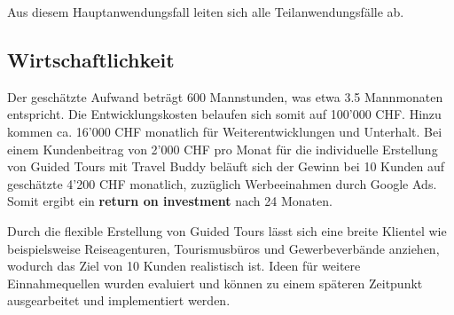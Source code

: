 Aus diesem Hauptanwendungsfall leiten sich alle Teilanwendungsfälle ab.

\subsection{Wirtschaftlichkeit}\label{Wirtschaftlichkeit}
Der geschätzte Aufwand beträgt 600 Mannstunden, was etwa 3.5 Mannmonaten entspricht. Die
Entwicklungskosten belaufen sich somit auf 100'000 CHF. Hinzu kommen ca. 16'000 CHF monatlich
für Weiterentwicklungen und Unterhalt. Bei einem Kundenbeitrag von 2'000 CHF pro Monat für
die individuelle Erstellung von Guided Tours mit Travel Buddy beläuft sich der Gewinn bei
10 Kunden auf geschätzte 4'200 CHF monatlich, zuzüglich Werbeeinahmen durch Google Ads.
Somit ergibt ein \textbf{return on investment} nach 24 Monaten.

Durch die flexible Erstellung von Guided Tours lässt sich eine breite Klientel wie beispielsweise Reiseagenturen, Tourismusbüros und Gewerbeverbände  anziehen, wodurch das Ziel von 10 Kunden realistisch ist. Ideen für weitere Einnahmequellen wurden evaluiert und können zu einem späteren Zeitpunkt ausgearbeitet und implementiert werden.

